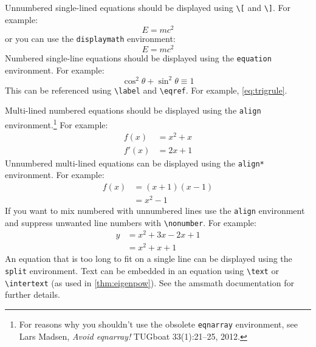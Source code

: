\documentclass[letterpaper,10pt]{article}
\begin{document}
Unnumbered single-lined equations should be displayed using
\verb|\[| and \verb|\]|. For example:
\[E = m c^2\]
or you can use the \texttt{displaymath} environment:
\begin{displaymath}
  E = m c^2
\end{displaymath}
Numbered single-line equations should be displayed using the
\texttt{equation} environment. For example:
\begin{equation}\label{eq:trigrule}
  \cos^2\theta + \sin^2\theta \equiv 1
\end{equation}
This can be referenced using \verb|\label| and \verb|\eqref|.
For example, \eqref{eq:trigrule}.

Multi-lined numbered equations should be displayed using the
\texttt{align} environment.\footnote{For reasons why you
  shouldn't use the obsolete \texttt{eqnarray} environment, see
  Lars Madsen, \emph{Avoid eqnarray!} TUGboat 33(1):21--25, 2012.} For example:
\begin{align}
  f(x)  & = x^2 + x\label{eq:f} \\
  f'(x) & = 2x + 1\label{eq:df}
\end{align}
Unnumbered multi-lined equations can be displayed using the
\texttt{align*} environment. For example:
\begin{align*}
  f(x) & = (x+1)(x-1) \\
       & = x^2 - 1
\end{align*}
If you want to mix numbered with unnumbered lines use the
\texttt{align} environment and suppress unwanted line numbers with
\verb|\nonumber|. For example:
\begin{align}
  y & = x^2 + 3x - 2x + 1\nonumber \\
    & = x^2 + x + 1\label{eq:y}
\end{align}
An equation that is too long to fit on a single line can be
displayed using the \texttt{split} environment.
Text can be embedded in an equation using \verb|\text| or
\verb|\intertext| (as used in \cref{thm:eigenpow}).
See the \textsf{amsmath} documentation for further details.
\end{document}
